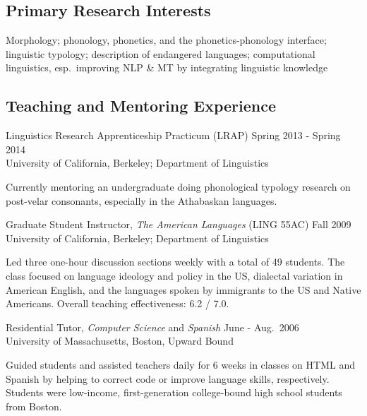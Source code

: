 \documentclass[11pt]{article}
\renewcommand{\it}[1]{\textit{#1}}
\newenvironment{myindentpar}[1]%
 {\begin{list}{}%
         {\setlength{\leftmargin}{#1}}%
         \item[]%
 }
 {\end{list}}
\begin{document}
\subsection*{Primary Research Interests}

Morphology; phonology, phonetics, and the phonetics-phonology interface; linguistic typology; %
description of endangered languages; %
computational linguistics, esp.~improving NLP \& MT by integrating linguistic knowledge

\subsection*{Teaching and Mentoring Experience}

Linguistics Research Apprenticeship Practicum (LRAP) \hfill Spring 2013 - Spring 2014 \\
\noindent University of California, Berkeley; Department of Linguistics

\begin{myindentpar}{0.45in}
Currently mentoring an undergraduate doing phonological typology research on post-velar consonants, especially in the Athabaskan languages. 
\end{myindentpar}

\noindent Graduate Student Instructor, \it{The American Languages} (LING 55AC) \hfill Fall 2009 \\
\noindent University of California, Berkeley; Department of Linguistics

\begin{myindentpar}{0.45in}
Led three one-hour discussion sections weekly with a total of 49 students. The class focused on language ideology and policy in the US, dialectal variation in American English, and the languages spoken by immigrants to the US and Native Americans. Overall teaching effectiveness: 6.2 / 7.0.
\end{myindentpar}

\noindent Residential Tutor, \it{Computer Science} and \it{Spanish} \hfill June - Aug.~2006 \\
\noindent University of Massachusetts, Boston, Upward Bound

\begin{myindentpar}{0.45in}
Guided students and assisted teachers daily for 6 weeks in classes on HTML and Spanish by helping to correct code or improve language skills, respectively. Students were low-income, first-generation college-bound high school students from Boston. 
 \end{myindentpar}
\end{document}
